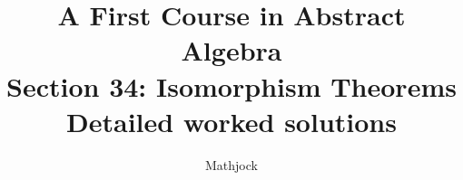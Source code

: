 
\title{\textbf{A First Course in Abstract Algebra}\\[0.3em]Section 34: Isomorphism Theorems\\[0.3em]\large Detailed worked solutions}
\author{Mathjock}
\date{}

\maketitle
\bookinfo
\tableofcontents
\clearpage
\renewcommand{\thesection}{34}
\renewcommand{\theHsection}{fraleigh.34}


